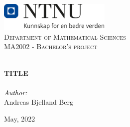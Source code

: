 
\begin{titlepage}
\vbox{ }
\vbox{ }
\begin{center}
\includegraphics[width=0.40\textwidth]{Images/NTNU_logo.png}\\[1cm]
\textsc{\LARGE Department of Mathematical Sciences}\\[1.5cm]
\textsc{\Large MA2002 - Bachelor's project}\\[0.5cm]
\vbox{ }

\HRule \\[0.4cm]
{ \huge \bfseries TITLE}\\[0.4cm]
\HRule \\[1.5cm]

\large
\emph{Author:}\\
Andreas Bjelland Berg
\vfill

{\large May, 2022}
\end{center}
\end{titlepage}